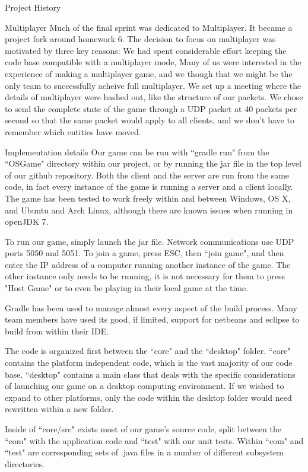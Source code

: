 \documentclass[12pt]{report}
\begin{document}
\begin{chapter}{Project History}
	\begin{subsection}{Multiplayer}
		Much of the final sprint was dedicated to Multiplayer. It became a project fork around 
		homework 6.  The decision to focus on multiplayer was motivated by three key reasons: We had spent
		considerable effort keeping the code base compatible with a multiplayer mode, Many of us were interested
		in the experience of making a multiplayer game, and we though that we might be the only team to successfully acheive full multiplayer.  We set up a meeting where the details of multiplayer were hashed out, like the structure of our packets.  We chose to send the complete state of the game through a UDP packet at 40 packets
		per second so that the same packet would apply to all clients, and we don't have to remember which entities have moved.
	\end{subsection}
\end{chapter}



\begin{chapter}{Implementation details} 
 Our game can be run with ``gradle run" from the ``OSGame" directory within our project, or by running the jar file in the top level of our github repository. Both the client and the server are run from the same code, in fact every instance of the game is running a server and a client locally. The game has been tested to work freely within and between Windows, OS X, and Ubuntu and Arch Linux, although there are known issues when running in openJDK 7.
 
 To run our game, simply launch the jar file. Network communications use UDP ports 5050 and 5051. To join a game, press ESC, then ``join game", and then enter the IP address of a computer running another instance of the game. The other instance only needs to be running, it is not necessary for them to press "Host Game" or to even be playing in their local game at the time.
 
 Gradle has been used to manage almost every aspect of the build process. Many team members have used its good, if limited, support for netbeans and eclipse to build from within their IDE.
 
 The code is organized first between the ``core" and the ``desktop" folder. ``core" contains the platform independent code, which is the vast majority of our code base. ``desktop" contains a main class that deals with the specific considerations of launching our game on a desktop computing environment. If we wished to expand to other platforms, only the code within the desktop folder would need rewritten within a new folder. 
 
 Inside of ``core/src" exists most of our game's source code, split between the ``com" with the application code and ``test" with our unit tests. Within ``com" and ``test" are corresponding sets of .java files in a number of different subsystem directories.
 
\end{chapter}
\end{document}
